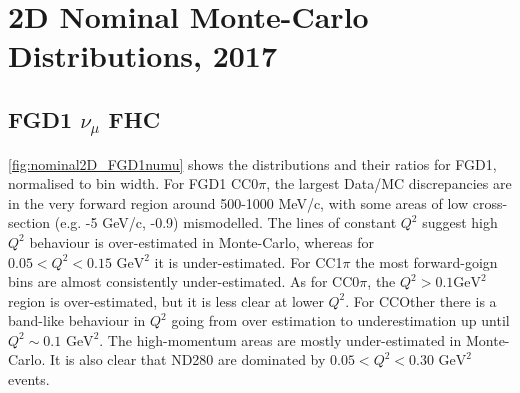 \chapter{2D Nominal Monte-Carlo Distributions, 2017}
\label{chap:nominal_mc_2017}

\section{FGD1 $\nu_\mu$ FHC}
\autoref{fig:nominal2D_FGD1numu} shows the \pmu \cosmu distributions and their ratios for FGD1, normalised to bin width. For FGD1 CC0$\pi$, the largest Data/MC discrepancies are in the very forward region around 500-1000 MeV/c, with some areas of low cross-section  (e.g. -5 GeV/c, -0.9) mismodelled. The lines of constant $Q^2$ suggest high $Q^2$ behaviour is over-estimated in Monte-Carlo, whereas for $0.05 < Q^2 < 0.15 \text{ GeV}^2$ it is under-estimated. For CC1$\pi$ the most forward-goign bins are almost consistently under-estimated. As for CC0$\pi$, the $Q^2 >0.1 \text{GeV}^2$ region is over-estimated, but it is less clear at lower $Q^2$. For CCOther there is a band-like behaviour in $Q^2$ going from over estimation to underestimation up until $Q^2\sim0.1\text{ GeV}^2$. The high-momentum areas are mostly under-estimated in Monte-Carlo. It is also clear that ND280 are dominated by $0.05 < Q^2 < 0.30\text{ GeV}^2$ events.

